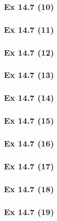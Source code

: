 \subsubsection{Ex 14.7 (10)}\label{sec:Ex_14.7.10}

\newpage		%

\subsubsection{Ex 14.7 (11)}\label{sec:Ex_14.7.11}

\subsubsection{Ex 14.7 (12)}\label{sec:Ex_14.7.12}

\subsubsection{Ex 14.7 (13)}\label{sec:Ex_14.7.13}

\subsubsection{Ex 14.7 (14)}\label{sec:Ex_14.7.14}

\subsubsection{Ex 14.7 (15)}\label{sec:Ex_14.7.15}

\subsubsection{Ex 14.7 (16)}\label{sec:Ex_14.7.16}

\subsubsection{Ex 14.7 (17)}\label{sec:Ex_14.7.17}

\subsubsection{Ex 14.7 (18)}\label{sec:Ex_14.7.18}

\subsubsection{Ex 14.7 (19)}\label{sec:Ex_14.7.19}

